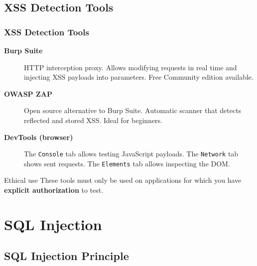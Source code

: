 \documentclass{beamer}
\def\emptyline{\vspace{10pt}}
\begin{document}
\subsection{XSS Detection Tools}

\begin{frame}
\frametitle{XSS Detection Tools}

\begin{description}
\item[\textbf{Burp Suite}] HTTP interception proxy. Allows modifying requests in real time and injecting XSS payloads into parameters. Free Community edition available.

\item[\textbf{OWASP ZAP}] Open source alternative to Burp Suite. Automatic scanner that detects reflected and stored XSS. Ideal for beginners.

\item[\textbf{DevTools (browser)}] The \texttt{Console} tab allows testing JavaScript payloads. The \texttt{Network} tab shows sent requests. The \texttt{Elements} tab allows inspecting the DOM.
\end{description}

\emptyline
\begin{alertblock}{Ethical use}
These tools must only be used on applications for which you have \textbf{explicit authorization} to test.
\end{alertblock}
\end{frame}


\section{SQL Injection}


\subsection{SQL Injection Principle}
\end{document}
